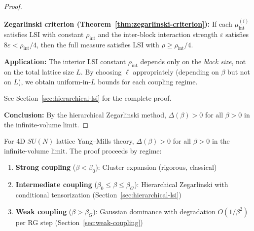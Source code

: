 \begin{proof}
\begin{tcolorbox}[colback=green!5, colframe=green!75!black, title=\textbf{Resolution: Hierarchical Block Decomposition}]
\textbf{Zegarlinski criterion (Theorem~\ref{thm:zegarlinski-criterion}):} If each 
$\mu_{\text{int}}^{(i)}$ satisfies LSI with constant $\rho_{\text{int}}$ and the 
inter-block interaction strength $\varepsilon$ satisfies $8\varepsilon < \rho_{\text{int}}/4$, 
then the full measure satisfies LSI with $\rho \geq \rho_{\text{int}}/4$.

\textbf{Application:} The interior LSI constant $\rho_{\text{int}}$ depends only on 
the \emph{block size}, not on the total lattice size $L$. By choosing $\ell$ 
appropriately (depending on $\beta$ but not on $L$), we obtain uniform-in-$L$ 
bounds for each coupling regime.

See Section~\ref{sec:hierarchical-lsi} for the complete proof.
\end{tcolorbox}

\textbf{Conclusion:} By the hierarchical Zegarlinski method, $\Delta(\beta) > 0$ 
for all $\beta > 0$ in the infinite-volume limit.
\end{proof}

\begin{theorem}
\label{thm:gap-all-beta}
For 4D $SU(N)$ lattice Yang--Mills theory, $\Delta(\beta) > 0$ for all $\beta > 0$ 
in the infinite-volume limit. The proof proceeds by regime:
\begin{enumerate}
\item \textbf{Strong coupling} ($\beta < \beta_0$): Cluster expansion (rigorous, classical)
\item \textbf{Intermediate coupling} ($\beta_0 \leq \beta \leq \beta_G$): Hierarchical 
Zegarlinski with conditional tensorization (Section~\ref{sec:hierarchical-lsi})
\item \textbf{Weak coupling} ($\beta > \beta_G$): Gaussian dominance with 
degradation $O(1/\beta^2)$ per RG step (Section~\ref{sec:weak-coupling})
\end{enumerate}
\end{theorem}

